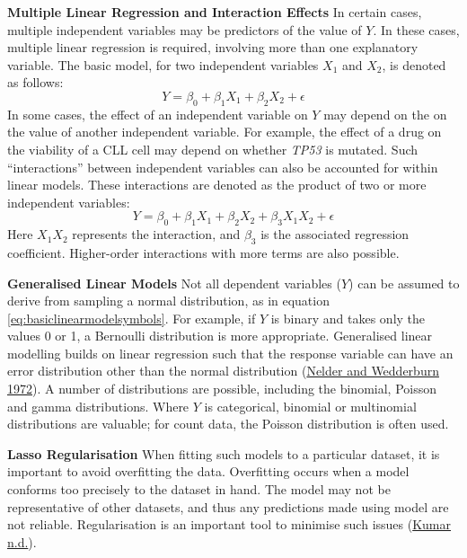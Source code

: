 \documentclass[11pt, a4paper, twosided]{book}
\begin{document}
\textbf{Multiple Linear Regression and Interaction Effects}
In certain cases, multiple independent variables may be predictors of the value of \(Y\). In these cases, multiple linear regression is required, involving more than one explanatory variable. The basic model, for two independent variables \(X_{1}\) and \(X_{2}\), is denoted as follows:
\begin{equation}
            Y = \beta_{0} + \beta_{1}X_{1} + \beta_{2}X_{2}   + \epsilon
                                       \label{eq:multiplelinearmodel}
    \end{equation}
In some cases, the effect of an independent variable on \(Y\) may depend on the on the value of another independent variable. For example, the effect of a drug on the viability of a CLL cell may depend on whether \emph{TP53} is mutated. Such ``interactions'' between independent variables can also be accounted for within linear models. These interactions are denoted as the product of two or more independent variables:
\begin{equation}
            Y = \beta_{0} + \beta_{1}X_{1} + \beta_{2}X_{2}  +\beta_{3} X_{1}X_{2}   + \epsilon
                                       \label{eq:interactionlinearmodel}
    \end{equation}
Here \(X_{1}X_{2}\) represents the interaction, and \(\beta_{3}\) is the associated regression coefficient. Higher-order interactions with more terms are also possible.

\textbf{Generalised Linear Models}
Not all dependent variables (\(Y\)) can be assumed to derive from sampling a normal distribution, as in equation \eqref{eq:basiclinearmodelsymbols}. For example, if \(Y\) is binary and takes only the values 0 or 1, a Bernoulli distribution is more appropriate. Generalised linear modelling builds on linear regression such that the response variable can have an error distribution other than the normal distribution (\protect\hyperlink{ref-Nelder1972}{Nelder and Wedderburn 1972}). A number of distributions are possible, including the binomial, Poisson and gamma distributions. Where \(Y\) is categorical, binomial or multinomial distributions are valuable; for count data, the Poisson distribution is often used.

\textbf{Lasso Regularisation}
When fitting such models to a particular dataset, it is important to avoid overfitting the data. Overfitting occurs when a model conforms too precisely to the dataset in hand. The model may not be representative of other datasets, and thus any predictions made using model are not reliable. Regularisation is an important tool to minimise such issues (\protect\hyperlink{ref-Kumar}{Kumar n.d.}).
\end{document}
